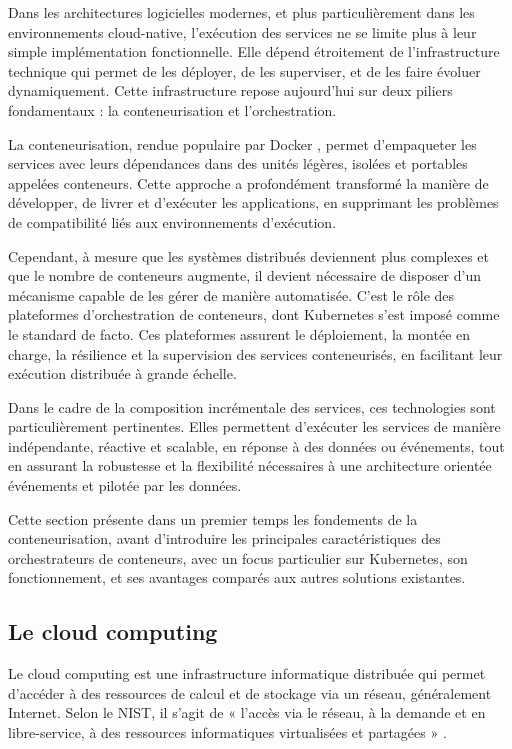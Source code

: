 Dans les architectures logicielles modernes, et plus particulièrement dans les environnements cloud-native, l’exécution des services ne se limite plus à leur simple implémentation fonctionnelle. Elle dépend étroitement de l’infrastructure technique qui permet de les déployer, de les superviser, et de les faire évoluer dynamiquement. Cette infrastructure repose aujourd’hui sur deux piliers fondamentaux : la conteneurisation et l’orchestration.

La conteneurisation, rendue populaire par Docker \cite{merkel2014docker}, permet d’empaqueter les services avec leurs dépendances dans des unités légères, isolées et portables appelées conteneurs. Cette approche a profondément transformé la manière de développer, de livrer et d'exécuter les applications, en supprimant les problèmes de compatibilité liés aux environnements d'exécution.

Cependant, à mesure que les systèmes distribués deviennent plus complexes et que le nombre de conteneurs augmente, il devient nécessaire de disposer d’un mécanisme capable de les gérer de manière automatisée. C’est le rôle des plateformes d’orchestration de conteneurs, dont Kubernetes \cite{7036275} s’est imposé comme le standard de facto. Ces plateformes assurent le déploiement, la montée en charge, la résilience et la supervision des services conteneurisés, en facilitant leur exécution distribuée à grande échelle.

Dans le cadre de la composition incrémentale des services, ces technologies sont particulièrement pertinentes. Elles permettent d’exécuter les services de manière indépendante, réactive et scalable, en réponse à des données ou événements, tout en assurant la robustesse et la flexibilité nécessaires à une architecture orientée événements et pilotée par les données.

Cette section présente dans un premier temps les fondements de la conteneurisation, avant d’introduire les principales caractéristiques des orchestrateurs de conteneurs, avec un focus particulier sur Kubernetes, son fonctionnement, et ses avantages comparés aux autres solutions existantes.

\subsection{Le cloud computing}
Le cloud computing est une infrastructure informatique distribuée qui permet d'accéder à des ressources de calcul et de stockage via un réseau, généralement Internet. Selon le NIST, il s'agit de « l'accès via le réseau, à la demande et en libre-service, à des ressources informatiques virtualisées et partagées » \cite{mell2011nist}.

